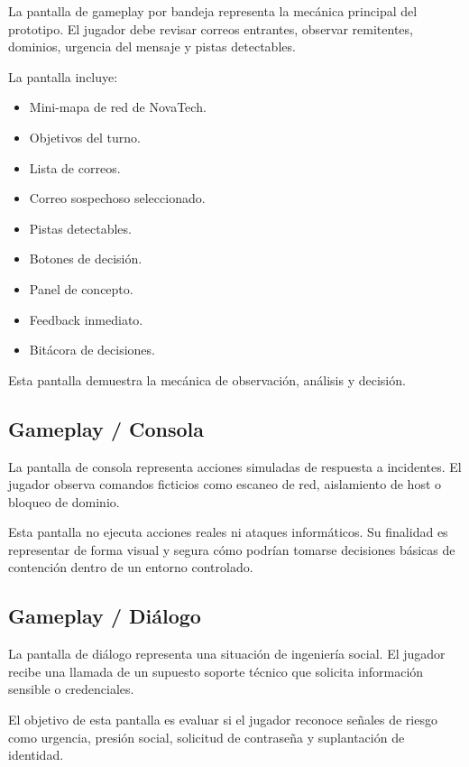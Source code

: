 ﻿\documentclass[12pt]{article}
\begin{document}
La pantalla de gameplay por bandeja representa la mec\'{a}nica principal del prototipo. El jugador debe revisar correos entrantes, observar remitentes, dominios, urgencia del mensaje y pistas detectables.

La pantalla incluye:

\begin{itemize}
    \item Mini-mapa de red de NovaTech.
    \item Objetivos del turno.
    \item Lista de correos.
    \item Correo sospechoso seleccionado.
    \item Pistas detectables.
    \item Botones de decisi\'{o}n.
    \item Panel de concepto.
    \item Feedback inmediato.
    \item Bit\'{a}cora de decisiones.
\end{itemize}

Esta pantalla demuestra la mec\'{a}nica de observaci\'{o}n, an\'{a}lisis y decisi\'{o}n.

\subsection{Gameplay / Consola}

La pantalla de consola representa acciones simuladas de respuesta a incidentes. El jugador observa comandos ficticios como escaneo de red, aislamiento de host o bloqueo de dominio.

Esta pantalla no ejecuta acciones reales ni ataques inform\'{a}ticos. Su finalidad es representar de forma visual y segura c\'{o}mo podr\'{i}an tomarse decisiones b\'{a}sicas de contenci\'{o}n dentro de un entorno controlado.

\subsection{Gameplay / Di\'{a}logo}

La pantalla de di\'{a}logo representa una situaci\'{o}n de ingenier\'{i}a social. El jugador recibe una llamada de un supuesto soporte t\'{e}cnico que solicita informaci\'{o}n sensible o credenciales.

El objetivo de esta pantalla es evaluar si el jugador reconoce se\~{n}ales de riesgo como urgencia, presi\'{o}n social, solicitud de contrase\~{n}a y suplantaci\'{o}n de identidad.
\end{document}

